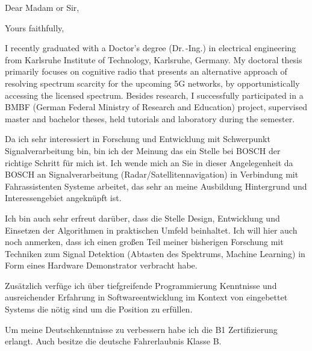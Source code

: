 \documentclass[11pt,a4paper,sans]{moderncv}        %
\begin{document}
\date{\today}
\opening{Dear Madam or Sir,}
\closing{Yours faithfully,}
\makelettertitle
I recently graduated with a Doctor's degree (Dr.\,-Ing.) in electrical engineering from Karlsruhe Institute of Technology, Karlsruhe, Germany. My doctoral thesis primarily focuses on cognitive radio that presents an alternative approach of resolving spectrum scarcity for the upcoming 5G networks, by opportunistically accessing the licensed spectrum. %
Besides research, I successfully participated in a BMBF (German Federal Ministry of Research and Education) project, supervised master and bachelor theses, held tutorials and laboratory during the semester. 




Da ich sehr interessiert in Forschung und Entwicklung mit Schwerpunkt Signalverarbeitung bin, bin ich der Meinung das ein Stelle bei BOSCH der richtige Schritt für mich ist. Ich wende mich an Sie in dieser Angelegenheit da BOSCH an Signalverarbeitung (Radar/Satellitennavigation) in Verbindung mit Fahrassistenten Systeme arbeitet, das sehr an meine Ausbildung Hintergrund und Interessengebiet angeknüpft ist.

Ich bin auch sehr erfreut darüber, dass die Stelle Design, Entwicklung und Einsetzen der Algorithmen in praktischen Umfeld beinhaltet. Ich will hier auch noch anmerken, dass ich einen großen Teil meiner bisherigen Forschung mit Techniken zum Signal Detektion (Abtasten des Spektrums, Machine Learning) in Form eines Hardware Demonstrator verbracht habe.

Zusätzlich verfüge ich über tiefgreifende Programmierung Kenntnisse und ausreichender Erfahrung in Softwareentwicklung im Kontext von eingebettet Systems die nötig sind um die Position zu erfüllen. 

Um meine Deutschkenntnisse zu verbessern habe ich die B1 Zertifizierung erlangt. Auch besitze die deutsche Fahrerlaubnis Klasse B.



\makeletterclosing
\end{document}
